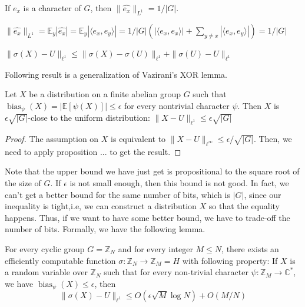 \begin{fact}
If $e_x$ is a character of $G$, then $\| \widehat{e_x} \|_{L^1} = 1 / |G|$.
\end{fact}
$\| \widehat{e_x} \|_{L^1} = \mathbb{E}_y |\widehat{e_x}| 
= \mathbb{E}_y |\langle e_x , e_y \rangle| = 1/|G| (|\langle e_x, e_x \rangle| 
+ \sum\limits_{y \neq x} |\langle e_x, e_y \rangle|) = 1/|G|$

\begin{fact}
$\| \sigma(X) - U \|_{\ell^1} \leq \| \sigma(X) - \sigma(U) \|_{\ell^1} + \| \sigma(U) - U \|_{\ell^1} $
\end{fact}

Following result is a generalization of Vazirani's XOR lemma.
\begin{lemma}
Let $X$ be a distribution on a finite abelian group $G$ such that $\operatorname{bias}_\psi(X) = |\mathbb{E}[\psi (X)] | \leq \epsilon$ for every nontrivial character $\psi$. Then $X$ is $\epsilon \sqrt{|G|}$-close to the uniform distribution: $\| X - U \|_{\ell^1} \leq \epsilon \sqrt{|G|}$
\end{lemma}

\begin{proof}
The assumption on $X$ is equivalent to $\|X - U \|_{\ell^\infty} \leq \epsilon/\sqrt{|G|}$. Then, we need to apply proposition ... to get the result.
\end{proof}

Note that the upper bound we have just get is propositional to the square root of the size of $G$. If $\epsilon$ is not small enough, then this bound is not good. In fact, we can't get a better bound for the same number of bits, which is $|G|$, since our inequality is tight,i.e, we can construct a distribution $X$ so that the equality happens. Thus, if we want to have some better bound, we have to trade-off the number of bits. Formally, we have the following lemma. 

\begin{lemma}
For every cyclic group $G = \mathbb{Z}_N$ and for every integer $M \leq N$, there exists an efficiently computable function $\sigma : \mathbb{Z}_N \rightarrow \mathbb{Z}_M = H$ with following property: If $X$ is a random variable over $\mathbb{Z}_N$ such that for every non-trivial character $\psi : \mathbb{Z}_M \rightarrow \mathbb{C}^*$, we have $\operatorname{bias}_{\psi}(X) \leq \epsilon$, then 
$$\| \sigma(X) - U \|_{\ell^1} \leq O(\epsilon \sqrt{M} \log N) + O(M/N)$$
\end{lemma}

